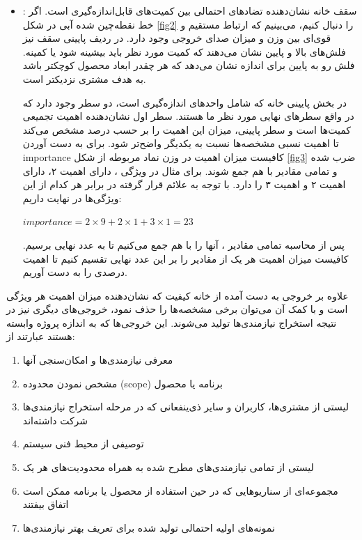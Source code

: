 {\begin{enumerate}[a)]
\begin{itemize}
\item
{}: سقف خانه نشان‌دهنده تضادهای احتمالی بین کمیت‌های قابل‌اندازه‌گیری است. اگر خط نقطه‌چین شده آبی در شکل \ref{fig2} را دنبال کنیم، می‌بینیم که ارتباط مستقیم و قوی‌ای بین وزن و میزان صدای خروجی وجود دارد. در ردیف پایینی سقف نیز فلش‌های بالا و پایین نشان‌ می‌دهند که کمیت مورد نظر باید بیشینه شود یا کمینه. فلش رو به پایین برای اندازه نشان‌ می‌دهد که هر چقدر ابعاد محصول کوچکتر باشد به هدف مشتری نزدیکتر است. 

در بخش پایینی خانه که شامل واحد‌های اندازه‌گیری  است، دو سطر وجود دارد که در واقع سطرهای نهایی مورد نظر ما هستند. سطر اول نشان‌دهنده اهمیت تجمیعی کمیت‌ها است و سطر پایینی، میزان این اهمیت را بر حسب درصد مشخص می‌کند تا اهمیت نسبی مشخصه‌ها نسبت به یکدیگر واضح‌تر شود. برای به دست آوردن importance کافیست میزان اهمیت  در وزن نماد مربوطه از شکل \ref{fig3} ضرب شده و تمامی مقادیر با هم جمع شوند. برای مثال در ویژگی ،  دارای اهمیت ۲،  دارای اهمیت ۲ و  اهمیت ۳ را دارد. با توجه به علائم قرار گرفته در برابر هر کدام از این ويژگی‌ها در نهایت داریم:
\begin{latin}
$importance = 2\times 9 + 2 \times 1 + 3\times 1 = 23$
\end{latin}
پس از محاسبه تمامی مقادیر ، آنها را با هم جمع می‌کنیم تا به عدد نهایی  برسیم. کافیست میزان اهمیت هر یک از مقادیر را بر این عدد نهایی تقسیم کنیم تا اهمیت درصدی را به دست آوریم. 
\end{itemize}

علاوه بر خروجی به دست آمده از خانه کیفیت که نشان‌دهنده میزان اهمیت هر ویژگی‌ است و با کمک آن می‌توان برخی مشخصه‌ها را حذف نمود، خروجی‌های دیگری نیز در نتیجه استخراج نیازمندی‌ها تولید می‌شوند\cite{swbook}. این خروجی‌ها که به اندازه پروژه وابسته هستند عبارتند از:

\begin{enumerate}
	\item معرفی نیازمندی‌ها و امکان‌سنجی آنها
	\item مشخص نمودن محدوده (scope) برنامه یا محصول
	\item لیستی از مشتری‌ها، کاربران و سایر ذی‌ینفعانی که در مرحله استخراج نیازمندی‌ها شرکت داشته‌اند
	\item توصیفی از محیط فنی سیستم 
	\item لیستی از تمامی نیازمندی‌های مطرح شده به همراه محدودیت‌های هر یک
	\item مجموعه‌ای از سناریوهایی که در حین استفاده از محصول یا برنامه ممکن است اتفاق بیفتند
	\item نمونه‌های اولیه احتمالی تولید شده برای تعریف بهتر نیازمندی‌ها
\end{enumerate} 


\end{enumerate}}
